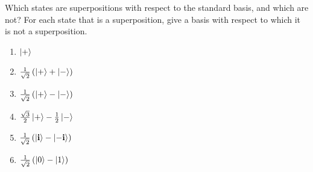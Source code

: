 \section{}

Which states are superpositions with respect to the standard basis, and which are not?
For each state that is a superposition, give a basis with respect to which it is not a
superposition.

\begin{multicols}{2}
\begin{enumerate}[label=\alph*.,ref={Ex.~\thesection\alph*}]
    \label{ex:2p3}
        \item $\ket{+}$
        \item $\tfrac{1}{\sqrt{2}} \left ( \ket{+} + \ket{-} \right )$
        \item $\tfrac{1}{\sqrt{2}} \left ( \ket{+} - \ket{-} \right )$
        \item $\tfrac{\sqrt{3}}{2} \ket{+} - \tfrac{1}{2} \ket{-}$
        \item $\tfrac{1}{\sqrt{2}} \left ( \ket{\mathbf{i}} - \ket{- \mathbf{i}} \right )$
        \item $\tfrac{1}{\sqrt{2}} \left ( \ket{0} - \ket{1} \right )$
    \end{enumerate}
\end{multicols}

